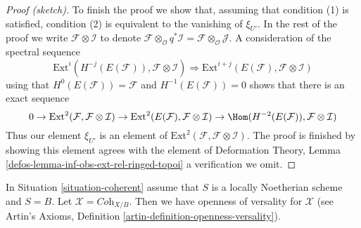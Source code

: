 \begin{proof}[Proof (sketch)]
\medskip\noindent
To finish the proof we show that, assuming that condition (1) is satisfied,
condition (2) is equivalent to the vanishing of $\xi_{U'}$. In the rest
of the proof we write $\mathcal{F} \otimes \mathcal{I}$ to denote
$\mathcal{F} \otimes_\mathcal{O} q^*\mathcal{I} =
\mathcal{F} \otimes_\mathcal{O} \mathcal{J}$. A consideration
of the spectral sequence
$$
\text{Ext}^i(H^{-j}(E(\mathcal{F})), \mathcal{F} \otimes \mathcal{I})
\Rightarrow
\text{Ext}^{i + j}(E(\mathcal{F}), \mathcal{F} \otimes \mathcal{I})
$$
using that $H^0(E(\mathcal{F})) = \mathcal{F}$ and
$H^{-1}(E(\mathcal{F})) = 0$
shows that there is an exact sequence
$$
0 \to
\text{Ext}^2(\mathcal{F}, \mathcal{F} \otimes \mathcal{I}) \to
\text{Ext}^2(E(\mathcal{F}), \mathcal{F} \otimes \mathcal{I}) \to
\Hom(H^{-2}(E(\mathcal{F})), \mathcal{F} \otimes \mathcal{I})
$$
Thus our element $\xi_{U'}$ is an element of
$\text{Ext}^2(\mathcal{F}, \mathcal{F} \otimes \mathcal{I})$.
The proof is finished by showing this element agrees with the
element of
Deformation Theory, Lemma \ref{defos-lemma-inf-obs-ext-rel-ringed-topoi}
a verification we omit.
\end{proof}

\begin{lemma}
\label{lemma-coherent-defo-thy-general}
In Situation \ref{situation-coherent} assume that
$S$ is a locally Noetherian scheme and $S = B$.
Let $\mathcal{X} = \textit{Coh}_{X/B}$.
Then we have openness of versality for $\mathcal{X}$ (see
Artin's Axioms, Definition \ref{artin-definition-openness-versality}).
\end{lemma}


